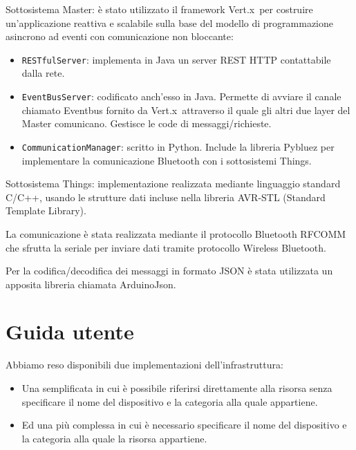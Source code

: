 \documentclass[11pt,a4paper]{article}
\newcommand{\vertx}{Vert.x}
\begin{document}
Sottosistema Master: \`e stato utilizzato il framework \vertx \,  per costruire un'applicazione reattiva e scalabile sulla base del modello di programmazione asincrono ad eventi con comunicazione non bloccante:

\begin{itemize}

\item \texttt{RESTfulServer}: implementa in Java un server REST HTTP contattabile dalla rete.

\item \texttt{EventBusServer}: codificato anch'esso in Java.
%
Permette di avviare il canale chiamato Eventbus fornito da \vertx \, attraverso il quale gli altri due layer del Master
comunicano. Gestisce le code di messaggi/richieste.

\item \texttt{CommunicationManager}: scritto in Python.
%
Include la libreria Pybluez per implementare la comunicazione Bluetooth con i sottosistemi Things.

\end{itemize}

Sottosistema Things: implementazione realizzata mediante linguaggio standard C/C++, usando le strutture dati incluse nella libreria AVR-STL (Standard Template Library).

La comunicazione \`e stata realizzata mediante il protocollo Bluetooth RFCOMM che sfrutta la seriale per inviare dati tramite protocollo Wireless Bluetooth.

Per la codifica/decodifica dei messaggi in formato JSON \`e stata utilizzata un apposita libreria chiamata ArduinoJson.

\section{Guida utente}

Abbiamo reso disponibili due implementazioni dell'infrastruttura:
\begin{itemize}

\item Una semplificata in cui \`e possibile riferirsi direttamente alla risorsa senza specificare il nome del dispositivo e la categoria alla quale appartiene.

\item Ed una pi\`u complessa in cui \`e necessario specificare il nome del dispositivo e la categoria alla quale la risorsa appartiene.

\end{itemize}
\end{document}
